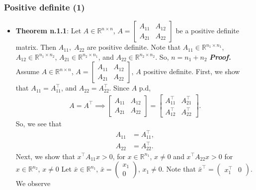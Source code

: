 \documentclass{report}
\begin{document}
    \subsubsection{Positive definite (1)}
    \begin{itemize}
        \item \textbf{Theorem n.1.1}: Let $A\in \mathbb{R}^{n\times n}$, $ A = \begin{bmatrix} A_{11} & A_{12} \\ A_{21} & A_{22} \end{bmatrix} $ be a positive definite matrix. Then $A_{11}, \; A_{22}$ are positive definite.
            \bigbreak \noindent 
            Note that $A_{11} \in \mathbb{R}^{n_{1} \times n_{1}}$, $A_{12} \in \mathbb{R}^{n_{1} \times n_{2}}$, $A_{21} \in \mathbb{R}^{n_{2} \times n_{1}}$, and $A_{22} \in \mathbb{R}^{n_{2} \times n_{2}}$. So, $n = n_{1} + n_{2} $
            \bigbreak \noindent 
            \textbf{\textit{Proof.}} Assume $A \in \mathbb{R}^{n\times n}$, $A = \begin{bmatrix} A_{11} & A_{12} \\ A_{21} & A_{22} \end{bmatrix} $, $A$ positive definite.
            \bigbreak \noindent
            First, we show that $A_{11} = A_{11}^{\top}$, and $A_{22} = A_{22}^{\top}$. Since $A$ p.d, 
            \begin{align*}
                A = A^{\top} \implies \begin{bmatrix} A_{11} & A_{12} \\ A_{21} & A_{22} \end{bmatrix} = \begin{bmatrix} A_{11}^{\top} & A_{21}^{\top} \\ A_{12}^{\top} & A_{22}^{\top} \end{bmatrix}
            .\end{align*}
            So, we see that
            \begin{align*}
                A_{11} &= A_{11}^{\top}, \\
                A_{22} &= A_{22}^{\top}
            .\end{align*}
            \bigbreak \noindent 
            Next, we show that $x^{\top}A_{11}x >0$, for $x \in \mathbb{R}^{n_{1}}$, $x\ne 0$ and $x^{\top}A_{22} x > 0$ for $x \in \mathbb{R}^{n_{2}} $, $x \ne 0 $
            \bigbreak \noindent 
            Let $ \bar{x} \in \mathbb{R}^{n_{1}}$, $ \bar{x} = \begin{pmatrix} x_{1} \\ 0 \end{pmatrix} $, $x_{1} \ne 0 $. Note that $ \bar{x}^{\top} = \begin{pmatrix} x_{1}^{\top} & 0\end{pmatrix} $. We observe

\end{itemize}
\end{document}
